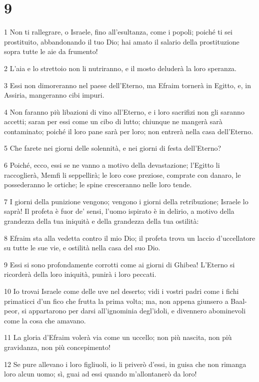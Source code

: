 \chapter{9}

\par 1 Non ti rallegrare, o Israele, fino all'esultanza, come i popoli; poiché ti sei prostituito, abbandonando il tuo Dio; hai amato il salario della prostituzione sopra tutte le aie da frumento!
\par 2 L'aia e lo strettoio non li nutriranno, e il mosto deluderà la loro speranza.
\par 3 Essi non dimoreranno nel paese dell'Eterno, ma Efraim tornerà in Egitto, e, in Assiria, mangeranno cibi impuri.
\par 4 Non faranno più libazioni di vino all'Eterno, e i loro sacrifizi non gli saranno accetti; saran per essi come un cibo di lutto; chiunque ne mangerà sarà contaminato; poiché il loro pane sarà per loro; non entrerà nella casa dell'Eterno.
\par 5 Che farete nei giorni delle solennità, e nei giorni di festa dell'Eterno?
\par 6 Poiché, ecco, essi se ne vanno a motivo della devastazione; l'Egitto li raccoglierà, Memfi li seppellirà; le loro cose preziose, comprate con danaro, le possederanno le ortiche; le spine cresceranno nelle loro tende.
\par 7 I giorni della punizione vengono; vengono i giorni della retribuzione; Israele lo saprà! Il profeta è fuor de' sensi, l'uomo ispirato è in delirio, a motivo della grandezza della tua iniquità e della grandezza della tua ostilità:
\par 8 Efraim sta alla vedetta contro il mio Dio; il profeta trova un laccio d'uccellatore su tutte le sue vie, e ostilità nella casa del suo Dio.
\par 9 Essi si sono profondamente corrotti come ai giorni di Ghibea! L'Eterno si ricorderà della loro iniquità, punirà i loro peccati.
\par 10 Io trovai Israele come delle uve nel deserto; vidi i vostri padri come i fichi primaticci d'un fico che frutta la prima volta; ma, non appena giunsero a Baal-peor, si appartarono per darsi all'ignominia degl'idoli, e divennero abominevoli come la cosa che amavano.
\par 11 La gloria d'Efraim volerà via come un uccello; non più nascita, non più gravidanza, non più concepimento!
\par 12 Se pure allevano i loro figliuoli, io li priverò d'essi, in guisa che non rimanga loro alcun uomo; sì, guai ad essi quando m'allontanerò da loro!
